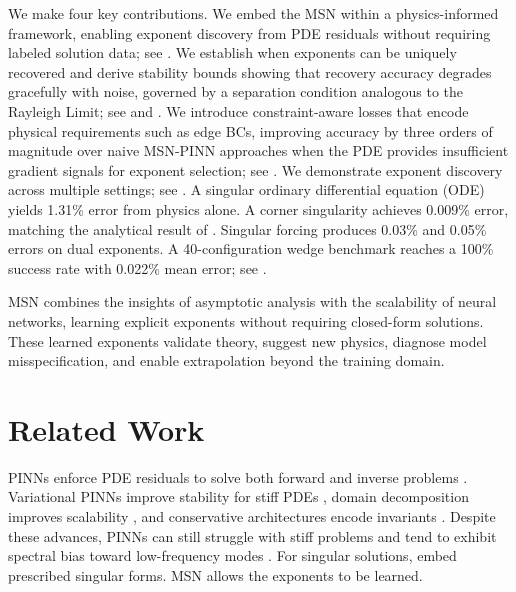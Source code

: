\documentclass{article}
\theoremstyle{plain}
\theoremstyle{definition}
\theoremstyle{remark}
\begin{document}
We make four key contributions. We embed the MSN within a physics-informed framework, enabling exponent discovery from PDE residuals without requiring labeled solution data; see . We establish when exponents can be uniquely recovered and derive stability bounds showing that recovery accuracy degrades gracefully with noise, governed by a separation condition analogous to the Rayleigh Limit; see  and . We introduce constraint-aware losses that encode physical requirements such as edge BCs, improving accuracy by three orders of magnitude over naive MSN-PINN approaches when the PDE provides insufficient gradient signals for exponent selection; see . We demonstrate exponent discovery across multiple settings; see . A singular ordinary differential equation (ODE) yields 1.31\% error from physics alone. A corner singularity achieves 0.009\% error, matching the analytical result of \citet{kondrat1967boundary}. Singular forcing produces 0.03\% and 0.05\% errors on dual exponents. A 40-configuration wedge benchmark reaches a 100\% success rate with 0.022\% mean error; see .

MSN combines the insights of asymptotic analysis with the scalability of neural networks, learning explicit exponents without requiring closed-form solutions. These learned exponents validate theory, suggest new physics, diagnose model misspecification, and enable extrapolation beyond the training domain.

\section{Related Work}
\label{sec:related}

PINNs enforce PDE residuals to solve both forward and inverse problems \cite{raissi2019physics}. Variational PINNs improve stability for stiff PDEs \cite{kharazmi2021hp}, domain decomposition improves scalability \cite{jagtap2020extended}, and conservative architectures encode invariants \cite{jagtap2020conservative}. Despite these advances, PINNs can still struggle with stiff problems \cite{krishnapriyan2021characterizing} and tend to exhibit spectral bias toward low-frequency modes \cite{rahaman2019spectral}. For singular solutions, \citet{jin2024solving} embed prescribed singular forms. MSN allows the exponents to be learned.
\end{document}
